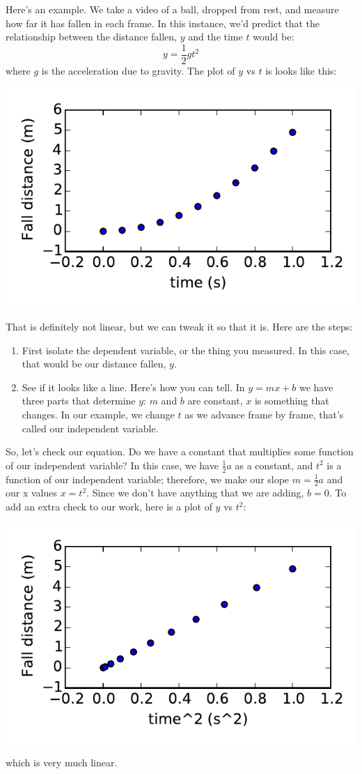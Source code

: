 \documentclass[twoside,11pt,ShortChapTitles]{BYUTextbook}
\begin{document}
Here's an example.  We take a video of a ball, dropped from rest, and measure how far it has fallen in each frame.  In this instance, we'd predict that the relationship between the distance fallen, $y$ and the time $t$ would be:
\[y=\frac{1}{2}gt^2\]
where $g$ is the acceleration due to gravity.  The plot of $y$ vs $t$ is looks like this:
\begin{center}
\includegraphics{Lab4_figs/yvst.pdf}
\end{center}
That is definitely not linear, but we can tweak it so that it is.  Here are the steps:
\begin{enumerate}
\item First isolate the dependent variable, or the thing you measured.  In this case, that would be our distance fallen, $y$.
\item See if it looks like a line.  Here's how you can tell. In $y=mx+b$ we have three parts that determine $y$: $m$ and $b$ are constant, $x$ is something that changes.  In our example, we change $t$ as we advance frame by frame, that's called our independent variable.
\end{enumerate}
So, let's check our equation. Do we have a constant that multiplies some function of our independent variable?  In this case, we have $\frac{1}{2}a$ as a constant, and $t^2$ is a function of our independent variable; therefore, we make our slope $m=\frac{1}{2}a$ and our x values $x=t^2$. Since we don't have anything that we are adding, $b=0$.  To add an extra check to our work, here is a plot of $y$ vs $t^2$:
\begin{center}
\includegraphics{Lab4_figs/yvst2.pdf}
\end{center}
which is very much linear.
\end{document}
